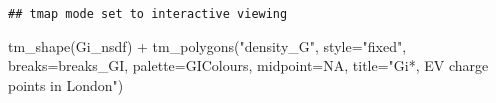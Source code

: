 \documentclass[
]{book}
\newenvironment{Shaded}{\begin{snugshade}}{\end{snugshade}}
\newcommand{\AttributeTok}[1]{\textcolor[rgb]{0.77,0.63,0.00}{#1}}
\newcommand{\ConstantTok}[1]{\textcolor[rgb]{0.00,0.00,0.00}{#1}}
\newcommand{\FunctionTok}[1]{\textcolor[rgb]{0.00,0.00,0.00}{#1}}
\newcommand{\NormalTok}[1]{#1}
\newcommand{\SpecialCharTok}[1]{\textcolor[rgb]{0.00,0.00,0.00}{#1}}
\newcommand{\StringTok}[1]{\textcolor[rgb]{0.31,0.60,0.02}{#1}}
\begin{document}
\begin{verbatim}
## tmap mode set to interactive viewing
\end{verbatim}

\begin{Shaded}
\begin{Highlighting}[]
\FunctionTok{tm\_shape}\NormalTok{(Gi\_nsdf) }\SpecialCharTok{+}
    \FunctionTok{tm\_polygons}\NormalTok{(}\StringTok{"density\_G"}\NormalTok{,}
        \AttributeTok{style=}\StringTok{"fixed"}\NormalTok{,}
        \AttributeTok{breaks=}\NormalTok{breaks\_GI,}
        \AttributeTok{palette=}\NormalTok{GIColours,}
        \AttributeTok{midpoint=}\ConstantTok{NA}\NormalTok{,}
        \AttributeTok{title=}\StringTok{"Gi*, EV charge points in London"}\NormalTok{)}
\end{Highlighting}
\end{Shaded}

\hypertarget{htmlwidget-848be7c37abdac5dbc3f}{}

  
\end{document}
